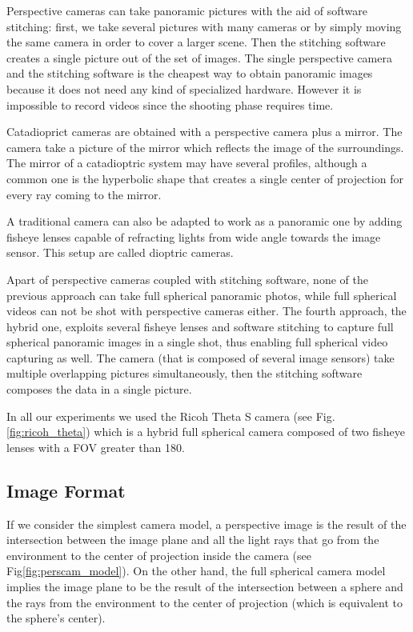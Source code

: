 Perspective cameras can take panoramic pictures with the aid of 
software stitching: first, we take several pictures with many cameras or by
simply moving 
the same camera in order to cover a larger scene. Then the stitching software 
creates a single picture out of the set of images.
The single perspective camera and the stitching software is the cheapest 
way to obtain panoramic images because it does not need any kind of specialized 
hardware. However it is impossible to record videos since the shooting phase 
requires time.

Catadioprict cameras are obtained with a perspective camera plus a mirror. 
The camera take a picture of the mirror which reflects the image of the 
surroundings. The mirror of a catadioptric system may have several profiles, 
although a common one is the hyperbolic shape that creates a single center of 
projection for every ray coming to the mirror. 


A traditional camera can also be adapted to work as a panoramic one by adding
fisheye lenses capable of refracting lights from wide angle towards the 
image sensor. This setup are called dioptric cameras.

Apart of perspective cameras coupled with stitching software, none of the 
previous approach can take full spherical panoramic photos, while full spherical 
videos can not be shot with perspective cameras either.
The fourth approach, the hybrid one, exploits several fisheye lenses and 
software stitching to capture full spherical panoramic images in a single shot, 
thus enabling full spherical video capturing as well.
The camera (that is composed of several image sensors) take multiple 
overlapping pictures simultaneously, then the stitching software composes the
data in a single picture.

In all our experiments we used the Ricoh Theta S camera 
(see Fig. \ref{fig:ricoh_theta}) which is a hybrid full spherical camera 
composed of two fisheye lenses with a FOV greater than 180\degree.
\label{fig:ricoh_theta}

\subsection{Image Format}
If we consider the simplest camera model, 
a perspective image is the result of the intersection between the image plane 
and all the light rays that go from the environment to the center of 
projection inside the camera (see Fig\ref{fig:perscam_model}).
\label{perscam_model}
On the other hand, the full spherical camera model implies the image plane 
to be the result of the intersection between a sphere and the rays from the 
environment to the center of projection (which is equivalent to the sphere's 
center).


